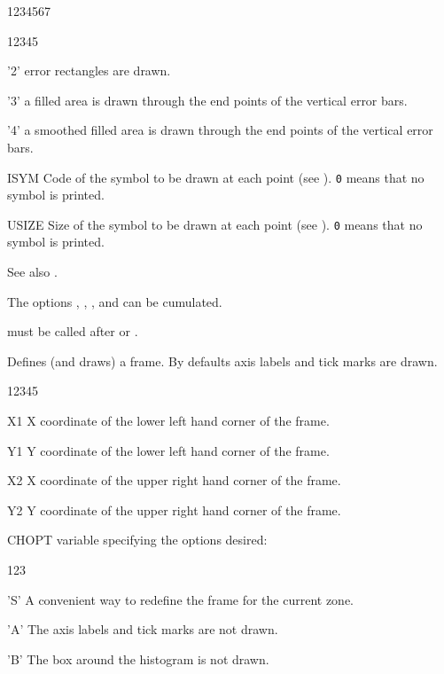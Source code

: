\begin{DLtt}{1234567}
\begin{DLtt}{12345}
  \item['2'] error rectangles are drawn.
  \item['3'] a filled area is drawn through the end points of the vertical 
             error bars.
  \item['4'] a smoothed filled area is drawn through the end points of the 
             vertical error bars.
\end{DLtt}
\item[ISYM]  Code of the symbol to be drawn at each point (see ).
             {\tt0} means that no symbol is printed.
\item[USIZE] Size of the symbol to be drawn at each point (see ).
             {\tt0} means that no symbol is printed.
\end{DLtt}
\Remarks
\begin{UL}
\item See also .
\item The options , , ,  and  can
      be cumulated.
\item {} must be called after  or .
\end{UL}


\Action
Defines (and draws) a frame. By defaults axis labels and tick marks are drawn.
\Pdesc
\begin{DLtt}{12345}
\item[X1]    X coordinate of the lower left hand corner of the frame.
\item[Y1]    Y coordinate of the lower left hand corner of the frame.
\item[X2]    X coordinate of the upper right hand corner of the frame.
\item[Y2]    Y coordinate of the upper right hand corner of the frame.
\item[CHOPT] \CHARACTER{} variable specifying the options desired:
\begin{DLtt}{123}
   \item['S'] A convenient way to redefine the frame for the current zone.
   \item['A'] The axis labels and tick marks are not drawn.
   \item['B'] The box around the histogram is not drawn.
\end{DLtt}
\end{DLtt}


